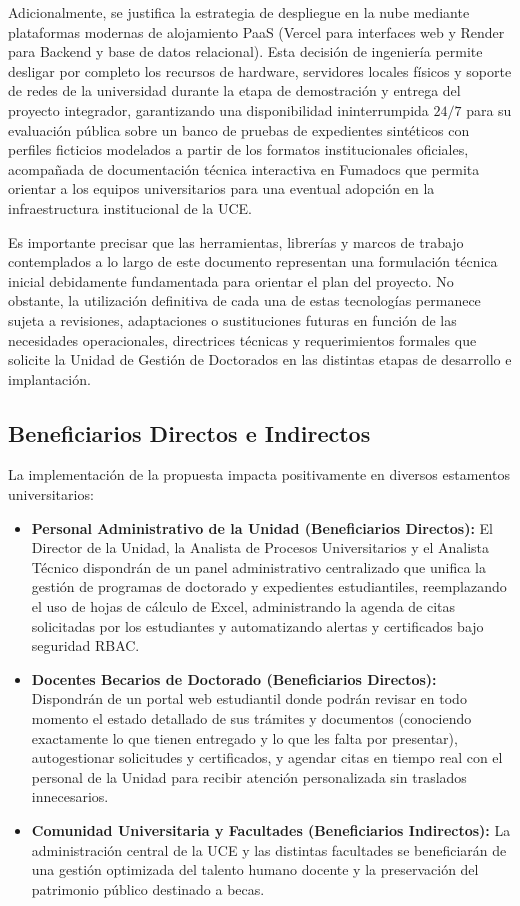 Adicionalmente, se justifica la estrategia de despliegue en la nube mediante plataformas modernas de alojamiento PaaS (Vercel para interfaces web y Render para Backend y base de datos relacional). Esta decisión de ingeniería permite desligar por completo los recursos de hardware, servidores locales físicos y soporte de redes de la universidad durante la etapa de demostración y entrega del proyecto integrador, garantizando una disponibilidad ininterrumpida $24/7$ para su evaluación pública sobre un banco de pruebas de expedientes sintéticos con perfiles ficticios modelados a partir de los formatos institucionales oficiales, acompañada de documentación técnica interactiva en Fumadocs que permita orientar a los equipos universitarios para una eventual adopción en la infraestructura institucional de la UCE.

Es importante precisar que las herramientas, librerías y marcos de trabajo contemplados a lo largo de este documento representan una formulación técnica inicial debidamente fundamentada para orientar el plan del proyecto. No obstante, la utilización definitiva de cada una de estas tecnologías permanece sujeta a revisiones, adaptaciones o sustituciones futuras en función de las necesidades operacionales, directrices técnicas y requerimientos formales que solicite la Unidad de Gestión de Doctorados en las distintas etapas de desarrollo e implantación.

\subsection{Beneficiarios Directos e Indirectos}

La implementación de la propuesta impacta positivamente en diversos estamentos universitarios:

\begin{itemize}[leftmargin=*,noitemsep]
    \item \textbf{Personal Administrativo de la Unidad (Beneficiarios Directos):} El Director de la Unidad, la Analista de Procesos Universitarios y el Analista Técnico dispondrán de un panel administrativo centralizado que unifica la gestión de programas de doctorado y expedientes estudiantiles, reemplazando el uso de hojas de cálculo de Excel, administrando la agenda de citas solicitadas por los estudiantes y automatizando alertas y certificados bajo seguridad RBAC.
    \item \textbf{Docentes Becarios de Doctorado (Beneficiarios Directos):} Dispondrán de un portal web estudiantil donde podrán revisar en todo momento el estado detallado de sus trámites y documentos (conociendo exactamente lo que tienen entregado y lo que les falta por presentar), autogestionar solicitudes y certificados, y agendar citas en tiempo real con el personal de la Unidad para recibir atención personalizada sin traslados innecesarios.
    \item \textbf{Comunidad Universitaria y Facultades (Beneficiarios Indirectos):} La administración central de la UCE y las distintas facultades se beneficiarán de una gestión optimizada del talento humano docente y la preservación del patrimonio público destinado a becas.
\end{itemize}

